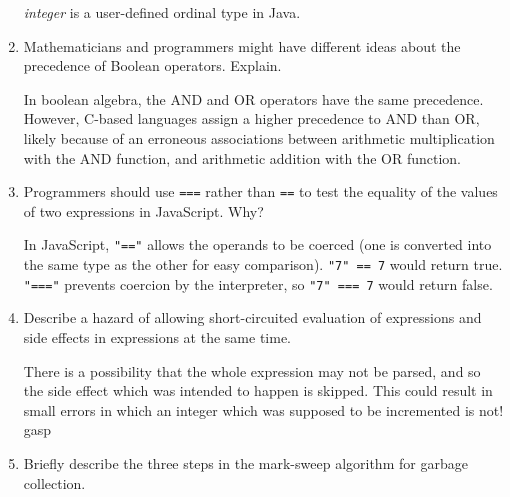 \begin{enumerate}
  \begin{answer}

    \textit{integer} is a user-defined ordinal type in Java.

    \end{answer}

  \item Mathematicians and programmers might have different ideas
    about the precedence of Boolean operators. Explain.

  \begin{answer}

    In boolean algebra, the AND and OR operators have the same precedence. However, C-based languages assign a higher precedence to AND than OR, likely because of an erroneous associations between arithmetic multiplication with the AND function, and arithmetic addition with the OR function. 

    \end{answer}

  \item Programmers should use \verb+===+ rather than \verb+==+ to
    test the equality of the values of two expressions in JavaScript. Why?

  \begin{answer}

    In JavaScript, \verb+"=="+ allows the operands to be coerced (one is converted into the same type as the other for easy comparison). \verb+"7" == 7+ would return true. \verb+"==="+ prevents coercion by the interpreter, so \verb+"7" === 7+ would return false.

    \end{answer}

  \item Describe a hazard of allowing short-circuited evaluation
    of expressions and side effects in expressions at the same time.

  \begin{answer}

    There is a possibility that the whole expression may not be parsed, and so the side effect which was intended to happen is skipped. This could result in small errors in which an integer which was supposed to be incremented is not! \ast gasp \ast

    \end{answer}

  \item Briefly describe the three steps in the mark-sweep algorithm
    for garbage collection.


\end{enumerate}
